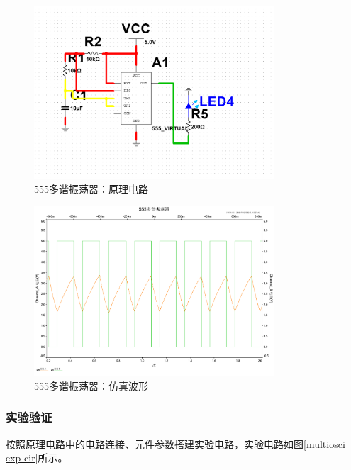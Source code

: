 \documentclass[UTF8]{ctexart}
\numberwithin{figure}{subsection}
\numberwithin{table}{subsection}
\numberwithin{equation}{subsection}
\begin{document}
\begin{figure}[H]
    \begin{center}
        \includegraphics[width=0.8\textwidth]{555/multiosci/sim circuit.png}
    \end{center}
    \caption{555多谐振荡器：原理电路}
    \label{multiosci sim cir}
\end{figure}

\begin{figure}[H]
    \begin{center}
        \includegraphics[width=0.8\textwidth]{555/multiosci/sim result.pdf}
    \end{center}
    \caption{555多谐振荡器：仿真波形}
    \label{multiosci sim res}
\end{figure}

\subsubsection{实验验证}
\par 按照原理电路中的电路连接、元件参数搭建实验电路，实验电路如图\ref{multiosci exp cir}所示。
\end{document}
